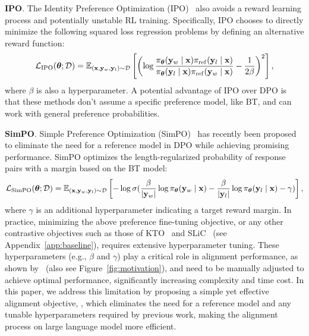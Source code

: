\textbf{IPO}. The Identity Preference Optimization (IPO)~\citep{azar2024general} also avoids a reward learning process and potentially unstable RL training. Specifically, IPO
chooses to directly minimize the following squared loss regression problems by defining an alternative reward function:
\begin{align}
    \mathcal{L}_{\rm{IPO}}({\boldsymbol{\theta}}; \mathcal{D})=\mathbb{E}_{(\mathbf{x}, \mathbf{y}_w, \mathbf{y}_l)\sim \mathcal{D}}\left[\left (\log \frac{\pi_{\boldsymbol{\theta}}(\mathbf{y}_w \mid \mathbf{x})\pi_{\mathrm{ref}}(\mathbf{y}_l \mid \mathbf{x})}{\pi_{\boldsymbol{\theta}}(\mathbf{y}_l \mid \mathbf{x} )\pi_{\mathrm{ref}}(\mathbf{y}_w \mid \mathbf{x})}-\frac{1}{2\beta}\right)^{2}\right], \label{Eq:IPO}
\end{align}
where $\beta$ is also a hyperparameter. A potential advantage of IPO over DPO is that these methods don’t assume a specific preference model, like BT, and can work with general preference probabilities.

\textbf{SimPO}. Simple Preference Optimization (SimPO)~\citep{meng2024simpo} has recently been proposed to eliminate the need for a reference model in DPO while achieving promising performance. SimPO optimizes the length-regularized probability of response pairs with a margin based on the BT model:  
\begin{align}
    \mathcal{L}_{\rm{SimPO}}({\boldsymbol{\theta}}; \mathcal{D})=\mathbb{E}_{(\mathbf{x}, \mathbf{y}_w, \mathbf{y}_l)\sim \mathcal{D}}\left[-\log \sigma(\frac{\beta}{|\mathbf{y}_{w}|} \log {\pi_{\boldsymbol{\theta}}(\mathbf{y}_w \mid \mathbf{x})}-\frac{\beta}{|\mathbf{y}_{l}|} \log {\pi_{\boldsymbol{\theta}}(\mathbf{y}_l \mid \mathbf{x} )}-\gamma) \right], \label{Eq:SimPO}
\end{align}
where $\gamma$ is an additional hyperparameter indicating a target reward margin. In practice, minimizing the above preference fine-tuning objective, or any other contrastive objectives such as those of KTO~\citep{ethayarajh2024kto} and SLiC~\citep{zhao2023slic} (see Appendix~\ref{app:baseline}), requires extensive hyperparameter tuning. These hyperparameters (e.g., $\beta$ and $\gamma$) play a critical role in alignment performance, as shown by~\citep{bai2022training, liudecoding, meng2024simpo} (also see Figure~\ref{fig:motivation}), and need to be manually adjusted to achieve optimal performance, significantly increasing complexity and time cost. In this paper, we address this limitation by proposing a simple yet effective alignment objective, \method, which eliminates the need for a reference model and any tunable hyperparameters required by previous work, making the alignment process on large language model more efficient.



